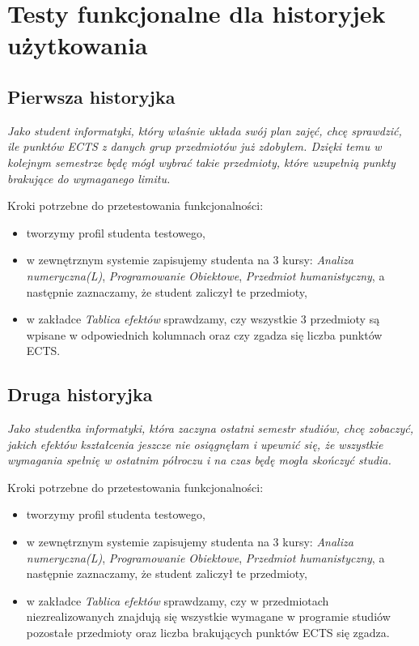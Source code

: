 \documentclass{article}
\begin{document}
\section{Testy funkcjonalne dla historyjek użytkowania}
\subsection{Pierwsza historyjka}
\textit{Jako student informatyki, który właśnie układa swój plan zajęć, chcę sprawdzić, ile punktów ECTS z danych grup przedmiotów już zdobyłem.
Dzięki temu w kolejnym semestrze będę mógł wybrać takie przedmioty, które uzupełnią punkty brakujące do wymaganego limitu.}

\medskip
\noindent Kroki potrzebne do przetestowania funkcjonalności:
\begin{itemize}
 \item tworzymy profil studenta testowego,
 \item w zewnętrznym systemie zapisujemy studenta na 3 kursy: \textit{Analiza numeryczna(L)}, \textit{Programowanie Obiektowe}, \textit{Przedmiot humanistyczny}, a następnie zaznaczamy, że student zaliczył te przedmioty,
 \item w zakładce \textit{Tablica efektów} sprawdzamy, czy wszystkie 3 przedmioty są wpisane w odpowiednich kolumnach oraz czy zgadza się liczba punktów ECTS.
\end{itemize}


\subsection{Druga historyjka}
\textit{Jako studentka informatyki, która zaczyna ostatni semestr studiów, chcę zobaczyć, jakich efektów kształcenia jeszcze nie osiągnęłam i upewnić się, że wszystkie wymagania spełnię w ostatnim półroczu i na czas będę mogła skończyć studia.}

\medskip
\noindent Kroki potrzebne do przetestowania funkcjonalności:
\begin{itemize}
 \item tworzymy profil studenta testowego,
 \item w zewnętrznym systemie zapisujemy studenta na 3 kursy: \textit{Analiza numeryczna(L)}, \textit{Programowanie Obiektowe}, \textit{Przedmiot humanistyczny}, a następnie zaznaczamy, że student zaliczył te przedmioty,
 \item w zakładce \textit{Tablica efektów} sprawdzamy, czy w przedmiotach niezrealizowanych znajdują się wszystkie wymagane w programie studiów pozostałe przedmioty oraz
 liczba brakujących punktów ECTS się zgadza.
\end{itemize}
\end{document}
